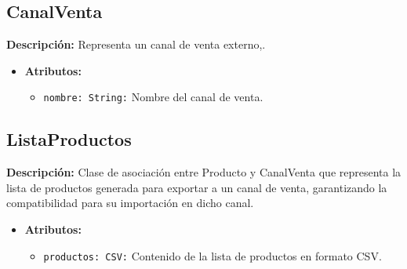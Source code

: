 \documentclass[12pt.a4paper]{article}
\begin{document}
\subsection{CanalVenta}
\textbf{Descripción:} Representa un canal de venta externo,.
    \begin{itemize}
        \item {\textbf{Atributos:}}
        \begin{itemize}
            \item \texttt{nombre: String:} Nombre del canal de venta.
        \end{itemize}
    \end{itemize}

\subsection{ListaProductos}
\textbf{Descripción:} Clase de asociación entre Producto y CanalVenta que representa la lista de productos generada para exportar a un canal de venta, garantizando la compatibilidad para su importación en dicho canal.
    \begin{itemize}
        \item {\textbf{Atributos:}}
        \begin{itemize}
            \item \texttt{productos: CSV:} Contenido de la lista de productos en formato CSV.
        \end{itemize}
    \end{itemize}    
\end{document}
